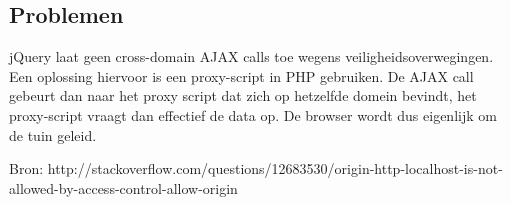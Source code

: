 \subsection{Problemen}

jQuery laat geen cross-domain AJAX calls toe wegens veiligheidsoverwegingen. Een oplossing hiervoor is een proxy-script in PHP gebruiken.
De AJAX call gebeurt dan naar het proxy script dat zich op hetzelfde domein bevindt, het proxy-script vraagt dan effectief de data op.
De browser wordt dus eigenlijk om de tuin geleid.

Bron: http://stackoverflow.com/questions/12683530/origin-http-localhost-is-not-allowed-by-access-control-allow-origin
